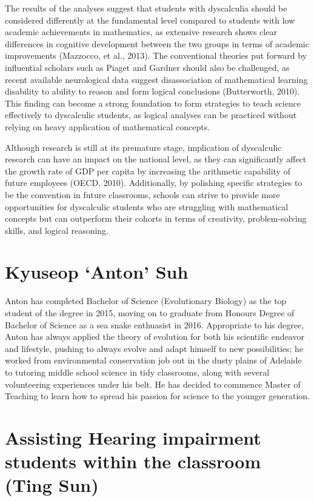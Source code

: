\documentclass[twoside,14pt,a4paper,notitlepage]{memoir}
\begin{document}
The results of the analyses suggest that students with dyscalculia should be considered differently at the fundamental level compared to students with low academic achievements in mathematics, as extensive research shows clear differences in cognitive development between the two groups in terms of academic improvements (Mazzocco, et al., 2013). The conventional theories put forward by influential scholars such as Piaget and Gardner should also be challenged, as recent available neurological data suggest disassociation of mathematical learning disability to ability to reason and form logical conclusions (Butterworth, 2010). This finding can become a strong foundation to form strategies to teach science effectively to dyscalculic students, as logical analyses can be practiced without relying on heavy application of mathematical concepts.

Although research is still at its premature stage, implication of dyscalculic research can have an impact on the national level, as they can significantly affect the growth rate of GDP per capita by increasing the arithmetic capability of future employees (OECD, 2010). Additionally, by polishing specific strategies to be the convention in future classrooms, schools can strive to provide more opportunities for dyscalculic students who are struggling with mathematical concepts but can outperform their cohorts in terms of creativity, problem-solving skills, and logical reasoning.

\section*{Kyuseop `Anton' Suh}

Anton has completed Bachelor of Science (Evolutionary Biology) as the top student of the degree in 2015, moving on to graduate from Honours Degree of Bachelor of Science as a sea snake enthuasist in 2016. Appropriate to his degree, Anton has always applied the theory of evolution for both his scientific endeavor and lifestyle, pushing to always evolve and adapt himself to new possibilities; he worked from environmental conservation job out in the dusty plains of Adelaide to tutoring middle school science in tidy classrooms, along with several volunteering experiences under his belt. He has decided to commence Master of Teaching to learn how to spread his passion for science to the younger generation.



\section*{Assisting Hearing impairment students within the classroom (Ting Sun)}
\label{aut:sun}
\end{document}
